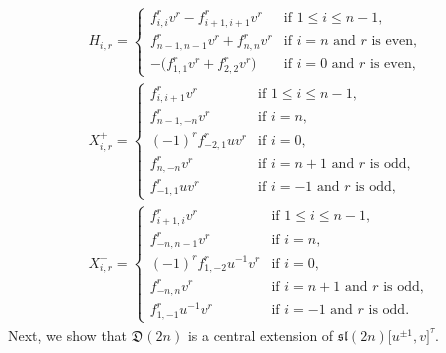 \documentclass[10pt,a4paper]{amsart}
\numberwithin{equation}{section}
\theoremstyle{definition}
\begin{document}
\begin{gather*}
H_{i,r}=\begin{cases}
f^r_{i,i}v^r-f^r_{i+1,i+1}v^r&\text{if }1\leq i\leq n-1,\\
f^r_{n-1,n-1}v^r+f^r_{n,n}v^r&\text{if }i=n\text{ and $r$ is even},\\
-\bigl(f^r_{1,1}v^r+f^r_{2,2}v^r\bigr)&\text{if }i=0\text{ and $r$ is even},
\end{cases}\\
X^+_{i,r}=\begin{cases}
f^r_{i,i+1}v^r&\text{if }1\leq i\leq n-1,\\
f^r_{n-1,-n}v^r&\text{if }i=n,\\
(-1)^rf^r_{-2,1}uv^r&\text{if }i=0,\\
f^r_{n,-n}v^r&\text{if }i=n+1\text{ and $r$ is odd},\\
f^r_{-1,1}uv^r&\text{if }i=-1\text{ and $r$ is odd},
\end{cases}\\
X^-_{i,r}=\begin{cases}
f^r_{i+1,i}v^r&\text{if }1\leq i\leq n-1,\\
f^r_{-n,n-1}v^r&\text{if }i=n,\\
(-1)^rf^r_{1,-2}u^{-1}v^r&\text{if }i=0,\\
f^r_{-n,n}v^r&\text{if }i=n+1\text{ and $r$ is odd},\\
f^r_{1,-1}u^{-1}v^r&\text{if }i=-1\text{ and $r$ is odd}.
\end{cases}
\end{gather*}
Next, we show that $\mathfrak{D}(2n)$ is a central extension of $\mathfrak{sl}(2n)\bigl[u^{\pm1},v\bigr]^\tau$.
\end{document}
